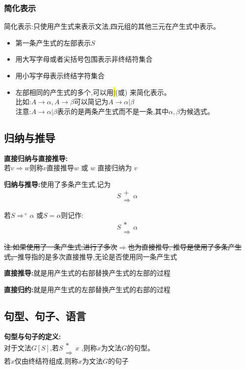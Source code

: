\subsubsection{简化表示}
简化表示:只使用产生式来表示文法,四元组的其他三元在产生式中表示。
\begin{itemize}
 \item 第一条产生式的左部表示$S$
 \item 用大写字母或者尖括号包围表示非终结符集合
 \item 用小写字母表示终结字符集合
 \item 左部相同的产生式的多个,可以用\hl{$|$}(或) 来简化表示。\\
       比如:$A\to \alpha , A \to \beta$可以简记为$A \to \alpha | \beta$\\
       注意:$A \to \alpha | \beta$表示的是两条产生式而不是一条,其中$\alpha , \beta$为候选式。
\end{itemize}

\subsection{归纳与推导}
\textbf{直接归纳与直接推导:}\\
若$v\Rightarrow w$则称$v$直接推导$w$ 或 $w$ 直接归纳为 $v$

\spaceline

\textbf{归纳与推导:}使用了多条产生式,记为
\begin{equation}
 \renewcommand{\arraystretch}{0.5}
 S \begin{array}{c} + \\ \Rightarrow \end{array} \alpha
\end{equation}

若$S  \Rightarrow^+ \alpha$ 或$S = \alpha$则记作:
\begin{equation}
 \renewcommand{\arraystretch}{0.5}
 S \begin{array}{c} * \\ \Rightarrow \end{array} \alpha
\end{equation}


\sout{注:如果使用了一条产生式,进行了多次$\Rightarrow$也为直接推导, 推导是使用了多条产生式。}推导指的是多次直接推导,无论是否使用同一条产生式

\textbf{直接推导:}就是用产生式的右部替换产生式的左部的过程

\textbf{直接归约:}就是用产生式的左部替换产生式的右部的过程

\subsection{句型、句子、语言}
\textbf{句型与句子的定义:}\\
对于文法$G[S]$,若$\renewcommand{\arraystretch}{0.5}S \begin{array}{c} * \\ \Rightarrow \end{array} x$ ,则称$x$为文法$G$的句型。\\
若$x$仅由终结符组成,则称$x$为文法$G$的句子

